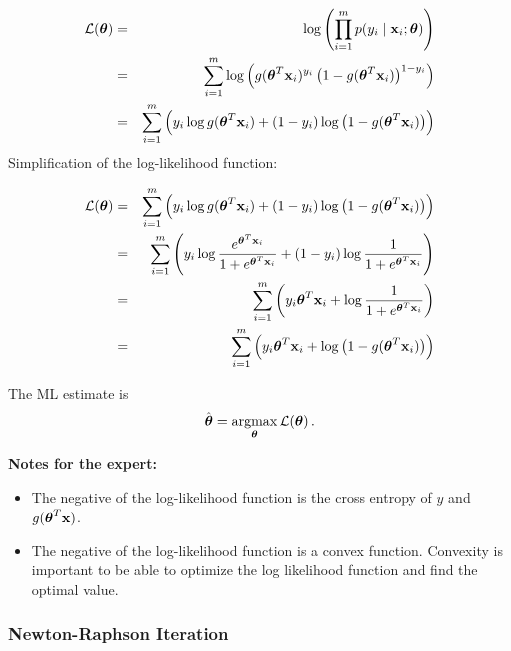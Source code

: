   \begin{eqnarray*}
    \mathcal{L} (\bm{\mathrm{\theta}}) &=& \log \left( \prod_{i=1}^m p(y_i\mid\bm{\mathrm{x}}_i;\bm{\mathrm{\theta}}) \right) \\     &=& \sum_{i=1}^m \log \left( g(\bm{\mathrm{\theta}}^T\bm{\mathrm{x}}_i)^{y_i}\,\big(1-g(\bm{\mathrm{\theta}}^T\bm{\mathrm{x}}_i)\big)^{1-y_i} \right) \\ 
                              &=& \sum_{i=1}^m \left(y_i \log g(\bm{\mathrm{\theta}}^T\bm{\mathrm{x}}_i) + (1-y_i)\log\big(1-g(\bm{\mathrm{\theta}}^T\bm{\mathrm{x}}_i)\big) \right)
  \end{eqnarray*}
  Simplification of the log-likelihood function:
 
  \begin{eqnarray*}
    \mathcal{L} (\bm{\mathrm{\theta}})
      &=& \sum_{i=1}^m \left( y_i \log g(\bm{\mathrm{\theta}}^T\bm{\mathrm{x}}_i) + (1-y_i)\log\big(1-g(\bm{\mathrm{\theta}}^T\bm{\mathrm{x}}_i)\big) \right) \\
      &=& \sum_{i=1}^m \left( y_i \log \frac{e^{\bm{\mathrm{\theta}}^T \bm{\mathrm{x}}_i}}{1 + e^{\bm{\mathrm{\theta}}^T \bm{\mathrm{x}}_i}} + (1 - y_i) \log \frac{1}{1 + e^{\bm{\mathrm{\theta}}^T \bm{\mathrm{x}}_i}} \right) \\
      &=& \sum_{i=1}^m \left( y_i \bm{\mathrm{\theta}}^T \bm{\mathrm{x}}_i + \log \frac{1}{1 + e^{\bm{\mathrm{\theta}}^T \bm{\mathrm{x}}_i}} \right) \\
      &=& \sum_{i=1}^m \left( y_i \bm{\mathrm{\theta}}^T \bm{\mathrm{x}}_i + \log \big( 1 - g(\bm{\mathrm{\theta}}^T \bm{\mathrm{x}}_i) \big) \right)
  \end{eqnarray*}

  The ML estimate is
  \begin{displaymath}
    \hat{\bm{\mathrm{\theta}}} = \operatorname*{argmax}_{\bm{\mathrm{\theta}}}\mathcal{L}(\bm{\mathrm{\theta}})\,.
  \end{displaymath}

  \textbf{Notes for the expert:} 

  \begin{itemize}
    \item The negative of the log-likelihood function is the cross entropy of
      $y$ and $g(\bm{\mathrm{\theta}}^T\bm{\mathrm{x}})$. 
    \item The negative of the log-likelihood function is a convex function. Convexity is important to be able to optimize the log likelihood function and find the optimal value. 
  \end{itemize}
  
  \subsubsection{Newton-Raphson Iteration}
  
